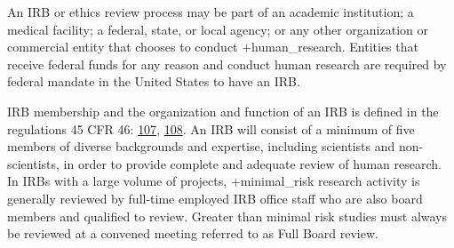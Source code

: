 \documentclass[
]{book}
\begin{document}
An IRB or ethics review process may be part of an academic institution; a medical facility; a federal, state, or local agency; or any other organization or commercial entity that chooses to conduct +human\_research\textbar. Entities that receive federal funds for any reason and conduct human research are required by federal mandate in the United States to have an IRB.

IRB membership and the organization and function of an IRB is defined in the regulations 45 CFR 46: \href{https://www.law.cornell.edu/cfr/text/45/46.107}{107}, \href{https://www.law.cornell.edu/cfr/text/45/46.108}{108}. An IRB will consist of a minimum of five members of diverse backgrounds and expertise, including scientists and non-scientists, in order to provide complete and adequate review of human research. In IRBs with a large volume of projects, +minimal\_risk\textbar{} research activity is generally reviewed by full-time employed IRB office staff who are also board members and qualified to review. Greater than minimal risk studies must always be reviewed at a convened meeting referred to as Full Board review.
\end{document}
